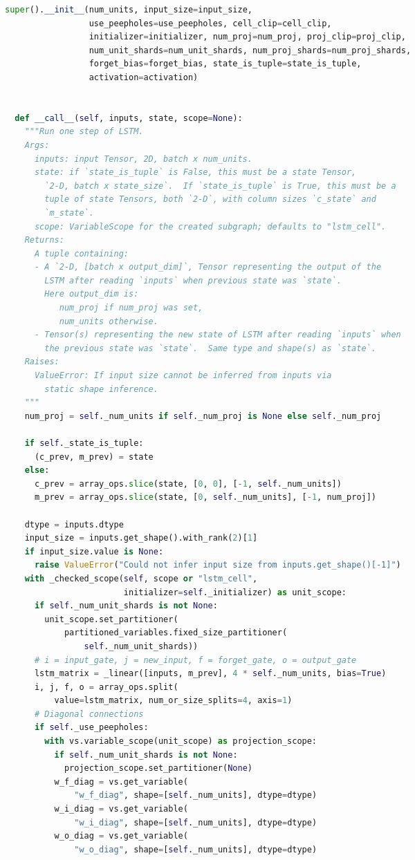 \begin{landscape}
\begin{multicols}{2}
\begin{lstlisting}[language=Python]
    super().__init__(num_units, input_size=input_size,
                 use_peepholes=use_peepholes, cell_clip=cell_clip,
                 initializer=initializer, num_proj=num_proj, proj_clip=proj_clip,
                 num_unit_shards=num_unit_shards, num_proj_shards=num_proj_shards,
                 forget_bias=forget_bias, state_is_tuple=state_is_tuple,
                 activation=activation)


  def __call__(self, inputs, state, scope=None):
    """Run one step of LSTM.
    Args:
      inputs: input Tensor, 2D, batch x num_units.
      state: if `state_is_tuple` is False, this must be a state Tensor,
        `2-D, batch x state_size`.  If `state_is_tuple` is True, this must be a
        tuple of state Tensors, both `2-D`, with column sizes `c_state` and
        `m_state`.
      scope: VariableScope for the created subgraph; defaults to "lstm_cell".
    Returns:
      A tuple containing:
      - A `2-D, [batch x output_dim]`, Tensor representing the output of the
        LSTM after reading `inputs` when previous state was `state`.
        Here output_dim is:
           num_proj if num_proj was set,
           num_units otherwise.
      - Tensor(s) representing the new state of LSTM after reading `inputs` when
        the previous state was `state`.  Same type and shape(s) as `state`.
    Raises:
      ValueError: If input size cannot be inferred from inputs via
        static shape inference.
    """
    num_proj = self._num_units if self._num_proj is None else self._num_proj

    if self._state_is_tuple:
      (c_prev, m_prev) = state
    else:
      c_prev = array_ops.slice(state, [0, 0], [-1, self._num_units])
      m_prev = array_ops.slice(state, [0, self._num_units], [-1, num_proj])

    dtype = inputs.dtype
    input_size = inputs.get_shape().with_rank(2)[1]
    if input_size.value is None:
      raise ValueError("Could not infer input size from inputs.get_shape()[-1]")
    with _checked_scope(self, scope or "lstm_cell",
                        initializer=self._initializer) as unit_scope:
      if self._num_unit_shards is not None:
        unit_scope.set_partitioner(
            partitioned_variables.fixed_size_partitioner(
                self._num_unit_shards))
      # i = input_gate, j = new_input, f = forget_gate, o = output_gate
      lstm_matrix = _linear([inputs, m_prev], 4 * self._num_units, bias=True)
      i, j, f, o = array_ops.split(
          value=lstm_matrix, num_or_size_splits=4, axis=1)
      # Diagonal connections
      if self._use_peepholes:
        with vs.variable_scope(unit_scope) as projection_scope:
          if self._num_unit_shards is not None:
            projection_scope.set_partitioner(None)
          w_f_diag = vs.get_variable(
              "w_f_diag", shape=[self._num_units], dtype=dtype)
          w_i_diag = vs.get_variable(
              "w_i_diag", shape=[self._num_units], dtype=dtype)
          w_o_diag = vs.get_variable(
              "w_o_diag", shape=[self._num_units], dtype=dtype)


\end{lstlisting}
\end{multicols}
\end{landscape}

